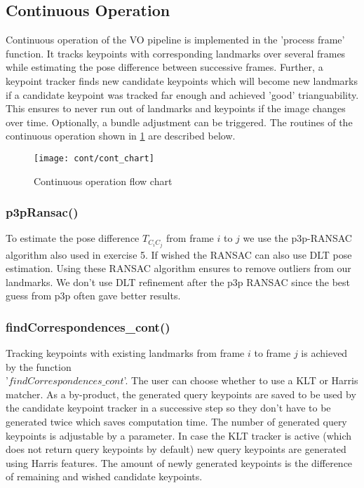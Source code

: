 \subsection{Continuous Operation}
\label{sec_cont_op}
Continuous operation of the VO pipeline is implemented in the 'process frame' function. It tracks keypoints with corresponding landmarks over several frames while estimating the pose difference between successive frames. Further, a keypoint tracker finds new candidate keypoints which will become new landmarks if a candidate keypoint was tracked far enough and achieved 'good' trianguability. This ensures to never run out of landmarks and keypoints if the image changes over time. Optionally, a bundle adjustment can be triggered. The routines of the continuous operation shown in \cref{img_flow_cont} are described below.

\begin{figure}[!ht]
	\centering
	\texttt{[image: cont/cont\_chart]}
	\caption{Continuous operation flow chart}
	\label{img_flow_cont}
\end{figure}

\subsubsection{p3pRansac()}
\label{ransac_cont}
To estimate the pose difference $T_{C_iC_j}$ from frame $i$ to $j$ we use the p3p-RANSAC algorithm also used in exercise 5. If wished the RANSAC can also use DLT pose estimation. Using these RANSAC algorithm ensures to remove outliers from our landmarks. We don't use DLT refinement after the p3p RANSAC since the best guess from p3p often gave better results.

\subsubsection{findCorrespondences\_cont()}
Tracking keypoints with existing landmarks from frame $i$ to frame $j$ is achieved by the function\\ '$findCorrespondences\_cont$'. The user can choose whether to use a KLT or Harris matcher. As a by-product, the generated query keypoints are saved to be used by the candidate keypoint tracker in a successive step so they don't have to be generated twice which saves computation time. The number of generated query keypoints is adjustable by a parameter. In case the KLT tracker is active (which does not return query keypoints by default) new query keypoints are generated using Harris features. The amount of newly generated keypoints is the difference of remaining and wished candidate keypoints.

